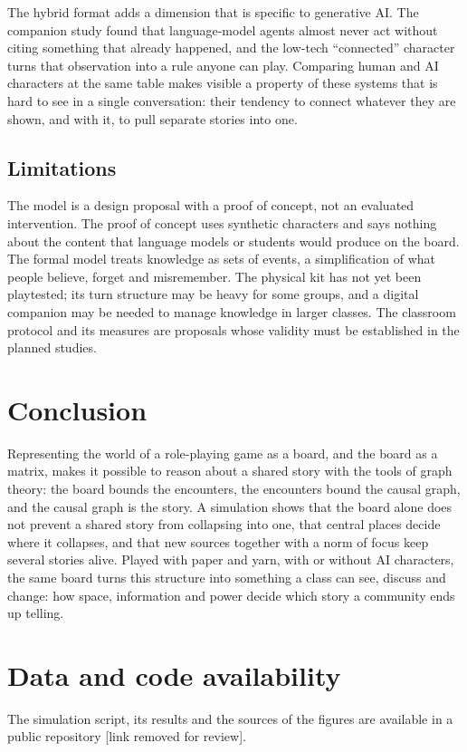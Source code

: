 \documentclass[12pt]{article}
\begin{document}
The hybrid format adds a dimension that is specific to generative AI. The
companion study found that language-model agents almost never act without
citing something that already happened, and the low-tech \enquote{connected}
character turns that observation into a rule anyone can play. Comparing
human and AI characters at the same table makes visible a property of these
systems that is hard to see in a single conversation: their tendency to
connect whatever they are shown, and with it, to pull separate stories into
one.

\subsection{Limitations}

The model is a design proposal with a proof of concept, not an evaluated
intervention. The proof of concept uses synthetic characters and says nothing
about the content that language models or students would produce on the
board. The formal model treats knowledge as sets of events, a simplification
of what people believe, forget and misremember. The physical kit has not yet
been playtested; its turn structure may be heavy for some groups, and a
digital companion may be needed to manage knowledge in larger classes. The
classroom protocol and its measures are proposals whose validity must be
established in the planned studies.

\section{Conclusion}

Representing the world of a role-playing game as a board, and the board as
a matrix, makes it possible to reason about a shared story with the tools of
graph theory: the board bounds the encounters, the encounters bound the
causal graph, and the causal graph is the story. A simulation shows that the
board alone does not prevent a shared story from collapsing into one, that
central places decide where it collapses, and that new sources together with
a norm of focus keep several stories alive. Played with paper and yarn, with
or without AI characters, the same board turns this structure into something
a class can see, discuss and change: how space, information and power decide
which story a community ends up telling.

\section*{Data and code availability}
The simulation script, its results and the sources of the figures are
available in a public repository [link removed for review].

\printbibliography
\end{document}
